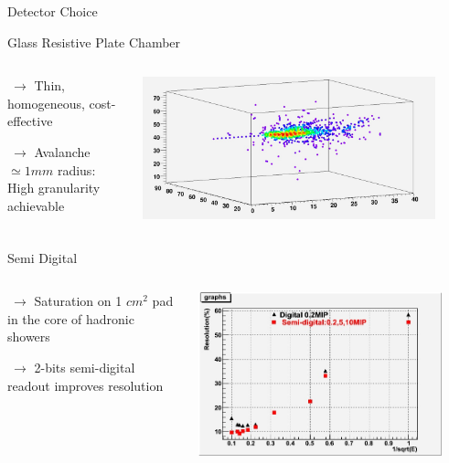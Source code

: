\documentclass[10pt]{beamer}
\begin{document}
\begin{frame}{Detector Choice}

  \begin{block}{Glass Resistive Plate Chamber}
    \begin{columns}
      \begin{column}{0.5\textwidth}
        {
   	  \par $ ~ \rightarrow$ Thin, homogeneous, cost-effective
          \par $ ~ \rightarrow$ Avalanche $\simeq 1 mm$ radius: High granularity achievable
        }   
      \end{column}
      \begin{column}{0.5\textwidth}
        \centerline{\includegraphics[width=0.9\textwidth]{jpg/ShowerExample}}
      \end{column}
    \end{columns}
  \end{block}
  
  \pause   

  \begin{block}{  Semi Digital}
    \begin{columns}
      \begin{column}{0.5\textwidth}
        {
          \par $ ~ \rightarrow$ Saturation on 1 $cm^2$ pad in the core of hadronic showers 
          \par $ ~\rightarrow$ 2-bits semi-digital readout improves resolution
        }
      \end{column}

      \begin{column}{0.5\textwidth}
        \centerline{\includegraphics[width=0.9\textwidth]{jpg/DigitalSemiDigital}}
      \end{column}
    \end{columns}


\end{block}
\end{frame}
\end{document}
